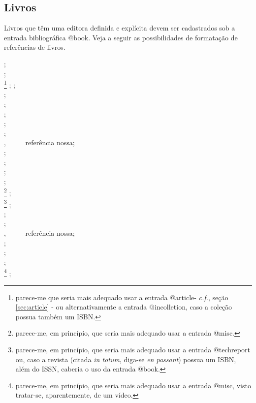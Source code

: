 \begin{apendicesenv}
\section{Livros}
\label{sec:books}

Livros que têm uma editora definida e explícita devem ser cadastrados sob a entrada bibliográfica {\ttfamily @book}. Veja a seguir as possibilidades de formatação de referências de livros.

{\small
    \cite{Albergari1994} ;\\
    \cite{alighieri1983} ;\\
    \cite{brasil1966}\footnote{parece-me que seria mais adequado usar a entrada {\ttfamily @article}- \textit{c.f.}, seção \autoref{sec:article} - ou alternativamente a entrada {\ttfamily @incolletion}, caso a coleção possua também um ISBN.} ;
    \cite{alves1993} ;\\
    \cite{alves1995} ;\\
    \cite{amaral1994} ;\\
    \cite{arbex1993} ;\\
    \cite{azevedo1994} ;\\
    \cite{Barabasi2002} ;\\
    \cite{Barbosa2004} , \ \ \ \ \ referência nossa;\\
    \cite{batista1992} ;\\
    \cite{biblica1970} ;\\
    \cite{brasil1988} ;\\
    \cite{brasil1995} ;\\
    \cite{brasil1998}\footnote{parece-me, em princípio, que seria mais adequado usar a entrada {\ttfamily @misc}.} ;\\
    \cite{brasileira1939}\footnote{parece-me, em princípio, que seria mais adequado usar a entrada {\ttfamily @techreport} ou, caso a revista (citada \textit{in totum}, diga-se \textit{en passant}) possua um ISBN, além do ISSN, caberia o uso da entrada {\ttfamily @book}.} ;\\
    \cite{brasileira1993} ;\\
    \cite{britanica1981} ;\\
    \cite{Buerger1989} , \ \ \ \ \ referência nossa;\\
    \cite{cardim1984} ;\\
    \cite{carruth1993} ;\\
    \cite{carvalho1994} ;\\
    \cite{ceravi1983}\footnote{parece-me, em princípio, que seria mais adequado usar a entrada {\ttfamily @misc}, visto tratar-se, aparentemente, de um vídeo.} ;\\
}
\end{apendicesenv}
